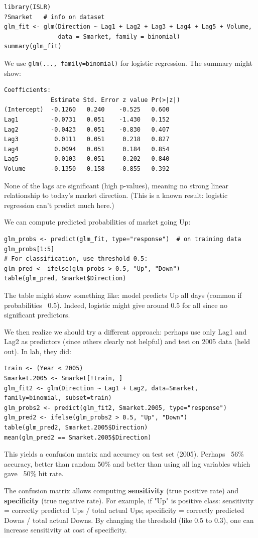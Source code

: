 \documentclass[11pt]{article}
\begin{document}
\begin{verbatim}
library(ISLR)
?Smarket   # info on dataset
glm_fit <- glm(Direction ~ Lag1 + Lag2 + Lag3 + Lag4 + Lag5 + Volume,
               data = Smarket, family = binomial)
summary(glm_fit)
\end{verbatim}
We use \texttt{glm(..., family=binomial)} for logistic regression. The summary might show:
\begin{verbatim}
Coefficients:
             Estimate Std. Error z value Pr(>|z|)
(Intercept)  -0.1260   0.240    -0.525   0.600
Lag1         -0.0731   0.051    -1.430   0.152
Lag2         -0.0423   0.051    -0.830   0.407
Lag3          0.0111   0.051     0.218   0.827
Lag4          0.0094   0.051     0.184   0.854
Lag5          0.0103   0.051     0.202   0.840
Volume       -0.1350   0.158    -0.855   0.392
\end{verbatim}
None of the lags are significant (high p-values), meaning no strong linear relationship to today's market direction. (This is a known result: logistic regression can't predict much here.)

We can compute predicted probabilities of market going Up:
\begin{verbatim}
glm_probs <- predict(glm_fit, type="response")  # on training data
glm_probs[1:5]
# For classification, use threshold 0.5:
glm_pred <- ifelse(glm_probs > 0.5, "Up", "Down")
table(glm_pred, Smarket$Direction)
\end{verbatim}
The table might show something like: model predicts Up all days (common if probabilities ~0.5). Indeed, logistic might give around 0.5 for all since no significant predictors.

We then realize we should try a different approach: perhaps use only Lag1 and Lag2 as predictors (since others clearly not helpful) and test on 2005 data (held out). In lab, they did:
\begin{verbatim}
train <- (Year < 2005)
Smarket.2005 <- Smarket[!train, ]
glm_fit2 <- glm(Direction ~ Lag1 + Lag2, data=Smarket, family=binomial, subset=train)
glm_probs2 <- predict(glm_fit2, Smarket.2005, type="response")
glm_pred2 <- ifelse(glm_probs2 > 0.5, "Up", "Down")
table(glm_pred2, Smarket.2005$Direction)
mean(glm_pred2 == Smarket.2005$Direction)
\end{verbatim}
This yields a confusion matrix and accuracy on test set (2005). Perhaps ~56\% accuracy, better than random 50\% and better than using all lag variables which gave ~50\% hit rate.

The confusion matrix allows computing \textbf{sensitivity} (true positive rate) and \textbf{specificity} (true negative rate). For example, if "Up" is positive class: sensitivity = correctly predicted Ups / total actual Ups; specificity = correctly predicted Downs / total actual Downs. By changing the threshold (like 0.5 to 0.3), one can increase sensitivity at cost of specificity.
\end{document}
